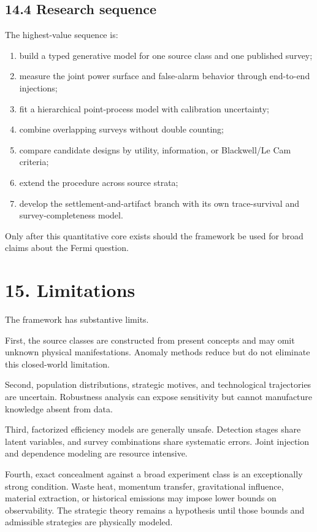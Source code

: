 \documentclass[11pt,a4paper]{article}
\begin{document}
\subsection{14.4 Research sequence}\label{144-research-sequence}

The highest-value sequence is:

\begin{enumerate}
\def\labelenumi{\arabic{enumi}.}
\item
  build a typed generative model for one source class and one published survey;
\item
  measure the joint power surface and false-alarm behavior through end-to-end injections;
\item
  fit a hierarchical point-process model with calibration uncertainty;
\item
  combine overlapping surveys without double counting;
\item
  compare candidate designs by utility, information, or Blackwell/Le Cam criteria;
\item
  extend the procedure across source strata;
\item
  develop the settlement-and-artifact branch with its own trace-survival and survey-completeness model.
\end{enumerate}

Only after this quantitative core exists should the framework be used for broad claims about the Fermi question.

\section{15. Limitations}\label{15-limitations}

The framework has substantive limits.

First, the source classes are constructed from present concepts and may omit unknown physical manifestations. Anomaly methods reduce but do not eliminate this closed-world limitation.

Second, population distributions, strategic motives, and technological trajectories are uncertain. Robustness analysis can expose sensitivity but cannot manufacture knowledge absent from data.

Third, factorized efficiency models are generally unsafe. Detection stages share latent variables, and survey combinations share systematic errors. Joint injection and dependence modeling are resource intensive.

Fourth, exact concealment against a broad experiment class is an exceptionally strong condition. Waste heat, momentum transfer, gravitational influence, material extraction, or historical emissions may impose lower bounds on observability. The strategic theory remains a hypothesis until those bounds and admissible strategies are physically modeled.
\end{document}
